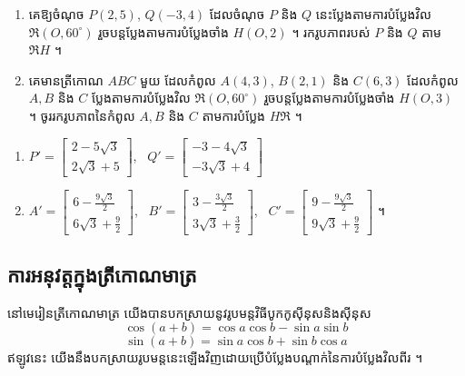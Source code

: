 \begin{pro}
\begin{enumerate}[a]
  \item គេឱ្យចំណុច $P(2, 5)$, $Q(-3, 4)$ ដែលចំណុច $P$ និង $Q$ នេះប្លែងតាមការបំប្លែងវិល $\mathfrak{R}(O, 60^\circ)$ រួចបន្តប្លែងតាមការបំប្លែងចាំង $H(O, 2)$ ។ រករូបភាពរបស់ $P$ និង $Q$ តាម $\mathfrak{R}H$ ។
  \item គេមានត្រីកោណ $ABC$ មួយ ដែលកំពូល $A(4, 3)$, $B(2, 1)$ និង $C(6, 3)$ ដែលកំពូល $A, B$ និង $C$ ប្លែងតាមការបំប្លែងវិល $\mathfrak{R}(O, 60^\circ)$ រួចបន្តប្លែងតាមការបំប្លែងចាំង $H(O, 3)$ ។ ចូររករូបភាពនៃកំពូល $A, B$ និង $C$ តាមការបំប្លែង $H\mathfrak{R}$ ។
\end{enumerate}
\ans
\begin{enumerate}[a]
  \item $P' = \begin{bmatrix} 2 - 5\sqrt{3}\\ 2\sqrt{3} + 5 \end{bmatrix}$, \ $Q' = \begin{bmatrix} -3 - 4\sqrt{3}\\ -3\sqrt{3} + 4 \end{bmatrix}$
  \item $A' = \begin{bmatrix} 6 - \frac{9\sqrt{3}}{2}\\[3pt] 6\sqrt{3} + \frac{9}{2} \end{bmatrix}$, \ $B' = \begin{bmatrix} 3 - \frac{3\sqrt{3}}{2}\\[3pt] 3\sqrt{3} + \frac{3}{2} \end{bmatrix}$, \ $C' = \begin{bmatrix} 9 - \frac{9\sqrt{3}}{2}\\[3pt] 9\sqrt{3} + \frac{9}{2} \end{bmatrix}$ ។
\end{enumerate}
\end{pro}

\subsection{ការអនុវត្តក្នុងត្រីកោណមាត្រ}

នៅមេរៀនត្រីកោណមាត្រ យើងបានបកស្រាយនូវរូបមន្តវិធីបូកកូស៊ីនុសនិងស៊ីនុស
\[ \cos(a + b) = \cos a\cos b - \sin a\sin b \]
\[ \sin(a + b) = \sin a\cos b + \sin b\cos a \]
ឥឡូវនេះ យើងនឹងបកស្រាយរូបមន្តនេះឡើងវិញដោយប្រើបំប្លែងបណ្ដាក់នៃការបំប្លែងវិលពីរ ។

